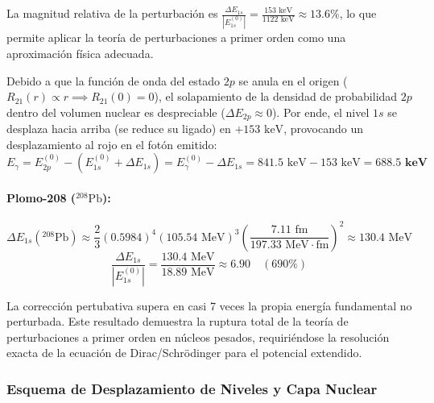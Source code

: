 \begin{problema}
La magnitud relativa de la perturbación es $\frac{\Delta E_{1s}}{|E_{1s}^{(0)}|} = \frac{153\text{ keV}}{1122\text{ keV}} \approx 13.6\%$, lo que permite aplicar la teoría de perturbaciones a primer orden como una aproximación física adecuada.

Debido a que la función de onda del estado $2p$ se anula en el origen ($R_{21}(r) \propto r \implies R_{21}(0) = 0$), el solapamiento de la densidad de probabilidad $2p$ dentro del volumen nuclear es despreciable ($\Delta E_{2p} \approx 0$). Por ende, el nivel $1s$ se desplaza hacia arriba (se reduce su ligado) en $+153\text{ keV}$, provocando un desplazamiento al rojo en el fotón emitido:
\begin{equation*}
E_\gamma = E_{2p}^{(0)} - (E_{1s}^{(0)} + \Delta E_{1s}) = E_\gamma^{(0)} - \Delta E_{1s} = 841.5\text{ keV} - 153\text{ keV} = \mathbf{688.5\text{ keV}}
\end{equation*}

\paragraph{Plomo-208 (${}^{208}\text{Pb}$):}
\begin{equation*}
\Delta E_{1s}({}^{208}\text{Pb}) \approx \frac{2}{3} (0.5984)^4 (105.54\text{ MeV})^3 \left( \frac{7.11\text{ fm}}{197.33\text{ MeV}\cdot\text{fm}} \right)^2 \approx 130.4\text{ MeV}
\end{equation*}
\begin{equation*}
\frac{\Delta E_{1s}}{|E_{1s}^{(0)}|} = \frac{130.4\text{ MeV}}{18.89\text{ MeV}} \approx 6.90 \quad (690\%)
\end{equation*}

La corrección pertubativa supera en casi 7 veces la propia energía fundamental no perturbada. Este resultado demuestra la ruptura total de la teoría de perturbaciones a primer orden en núcleos pesados, requiriéndose la resolución exacta de la ecuación de Dirac/Schrödinger para el potencial extendido.

\subsubsection*{Esquema de Desplazamiento de Niveles y Capa Nuclear}

\begin{center}
\end{center}
\end{problema}
